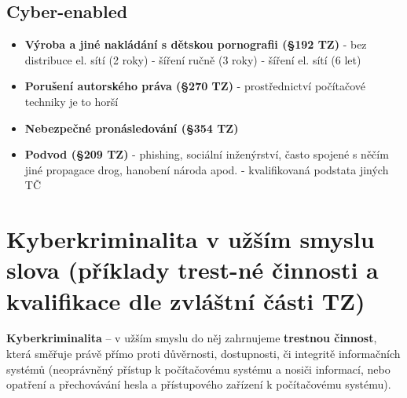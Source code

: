 \subsection{Cyber-enabled}
\begin{itemize}
    \item \textbf{Výroba a jiné nakládání s dětskou pornografii (§192 TZ)} - bez distribuce el. sítí (2 roky) -
šíření ručně (3 roky) - šíření el. sítí (6 let)
\item \textbf{Porušení autorského práva (§270 TZ)} - prostřednictví počítačové techniky je to horší
\item \textbf{Nebezpečné pronásledování (§354 TZ)}
\item \textbf{Podvod (§209 TZ)} - phishing, sociální inženýrství, často spojené s něčím jiné
propagace drog, hanobení národa apod. - kvalifikovaná podstata jiných TČ
\end{itemize}




\newpage
\section[Kyberkriminalita v užším smyslu slova (příklady trestné činnosti a~kvalifikace dle zvláštní části TZ)]{Kyberkriminalita v užším smyslu slova (příklady trest-né činnosti a kvalifikace dle zvláštní části TZ)}
\textbf{Kyberkriminalita} -- v užším smyslu do něj zahrnujeme \textbf{trestnou činnost}, která směřuje právě přímo proti důvěrnosti, dostupnosti, či integritě informačních systémů (neoprávněný přístup k počítačovému systému a nosiči informací, nebo opatření a přechovávání hesla a přístupového zařízení k počítačovému systému).

